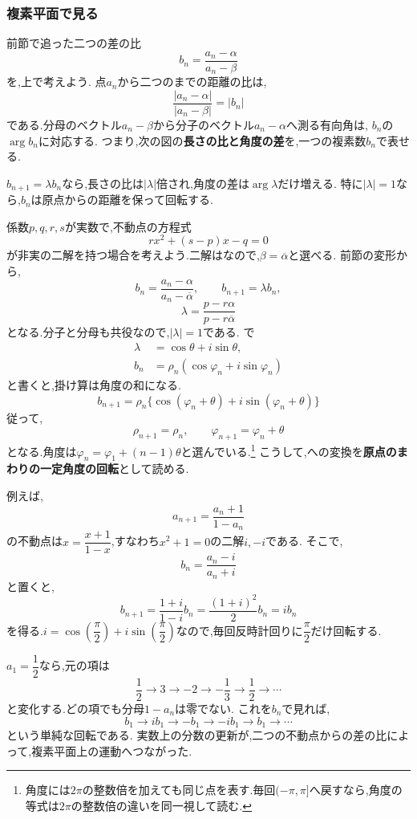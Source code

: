 
\subsubsection{複素平面で見る}

前節で追った二つの差の比
\[
  b_n=\frac{a_n-\alpha}{a_n-\beta}
\]
を,上で考えよう.
点$a_n$から二つのまでの距離の比は,
\[
  \frac{|a_n-\alpha|}{|a_n-\beta|}=|b_n|
\]
である.分母のベクトル$a_n-\beta$から分子のベクトル$a_n-\alpha$へ測る有向角は,
$b_n$の$\arg b_n$に対応する.
つまり,次の図の\textbf{長さの比と角度の差}を,一つの複素数$b_n$で表せる.
\BookFigMobius

$b_{n+1}=\lambda b_n$なら,長さの比は$|\lambda|$倍され,角度の差は$\arg\lambda$だけ増える.
特に$|\lambda|=1$なら,$b_n$は原点からの距離を保って回転する.

係数$p,q,r,s$が実数で,不動点の方程式
\[
  rx^2+(s-p)x-q=0
\]
が非実の二解を持つ場合を考えよう.二解はなので,$\beta=\overline\alpha$と選べる.
前節の変形から,
\[
  b_n=\frac{a_n-\alpha}{a_n-\overline\alpha},\qquad
  b_{n+1}=\lambda b_n,
\]
\[
  \lambda=\frac{p-r\alpha}{p-r\overline\alpha}
\]
となる.分子と分母も共役なので,$|\lambda|=1$である.
で
\begin{align*}
  \lambda&=\cos\theta+i\sin\theta,\\
  b_n&=\rho_n(\cos\varphi_n+i\sin\varphi_n)
\end{align*}
と書くと,掛け算は角度の和になる.
\[
  b_{n+1}=\rho_n\{\cos(\varphi_n+\theta)
  +i\sin(\varphi_n+\theta)\}
\]
従って,
\[
  \rho_{n+1}=\rho_n,\qquad
  \varphi_{n+1}=\varphi_n+\theta
\]
となる.角度は$\varphi_n=\varphi_1+(n-1)\theta$と選んでいる.\footnote{角度には$2\pi$の整数倍を加えても同じ点を表す.毎回$(-\pi,\pi]$へ戻すなら,角度の等式は$2\pi$の整数倍の違いを同一視して読む.}
こうして,への変換を\textbf{原点のまわりの一定角度の回転}として読める.

例えば,
\[
  a_{n+1}=\frac{a_n+1}{1-a_n}
\]
の不動点は$x=\dfrac{x+1}{1-x}$,すなわち$x^2+1=0$の二解$i,-i$である.
そこで,
\[
  b_n=\frac{a_n-i}{a_n+i}
\]
と置くと,
\[
  b_{n+1}=\frac{1+i}{1-i}b_n
  =\frac{(1+i)^2}{2}b_n=ib_n
\]
を得る.$i=\cos\left(\dfrac{\pi}{2}\right)+i\sin\left(\dfrac{\pi}{2}\right)$なので,毎回反時計回りに$\dfrac{\pi}{2}$だけ回転する.

$a_1=\dfrac{1}{2}$なら,元の項は
\[
  \frac12\longrightarrow3\longrightarrow-2
  \longrightarrow-\frac13\longrightarrow\frac12\longrightarrow\cdots
\]
と変化する.どの項でも分母$1-a_n$は零でない.
これを$b_n$で見れば,
\[
  b_1\longrightarrow ib_1\longrightarrow-b_1
  \longrightarrow-ib_1\longrightarrow b_1\longrightarrow\cdots
\]
という単純な回転である.
実数上の分数の更新が,二つの不動点からの差の比によって,複素平面上の運動へつながった.
